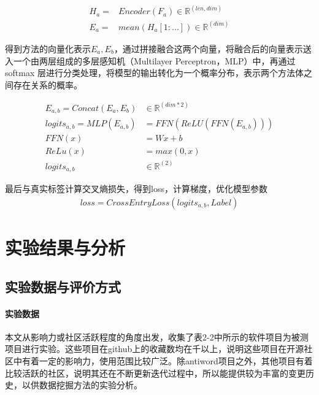 \begin{align}
H_a=&Encoder(F_a) \in \mathbb{R}^{(len,dim)} \\
E_a=&mean(H_a[1:...]) \in \mathbb{R}^{(dim)}
\end{align}

得到方法的向量化表示$ E_a, E_b$，通过拼接融合这两个向量，将融合后的向量表示送入一个由两层组成的多层感知机（Multilayer Perceptron，MLP）中，再通过 softmax 层进行分类处理，将模型的输出转化为一个概率分布，表示两个方法体之间存在关系的概率。

\begin{align}
E_{a,b}=Concat(E_a,E_b)& \in \mathbb{R}^{(dim*2)} \\
logits_{a,b}=MLP(E_{a,b})&=FFN(ReLU(FFN(E_{a,b}))) \\
FFN(x)&=Wx+b\\
ReLu(x)&=max(0,x)\\
logits_{a,b}& \in \mathbb{R}^{(2)}
\end{align}

最后与真实标签计算交叉熵损失，得到loss，计算梯度，优化模型参数
\begin{align}
loss=CrossEntryLoss(logits_{a,b}, Label)
\end{align}


\section{实验结果与分析}

\subsection{实验数据与评价方式}

\paragraph{实验数据}

本文从影响力或社区活跃程度的角度出发，收集了表2-2中所示的软件项目为被测项目进行实验。这些项目在github上的收藏数均在千以上，说明这些项目在开源社区中有着一定的影响力，使用范围比较广泛。除antiword项目之外，其他项目有着比较活跃的社区，说明其还在不断更新迭代过程中，所以能提供较为丰富的变更历史，以供数据挖掘方法的实验分析。

